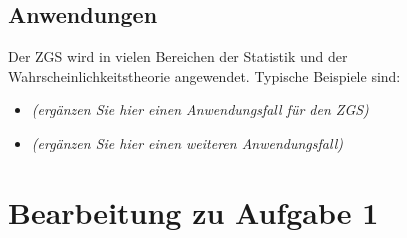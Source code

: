 \documentclass{article}
\begin{document}
\subsection{Anwendungen}

Der ZGS wird in vielen Bereichen der Statistik und der Wahrscheinlichkeitstheorie angewendet. Typische Beispiele sind:

\begin{itemize}
    \item \textit{(ergänzen Sie hier einen Anwendungsfall für den ZGS)}
    \item \textit{(ergänzen Sie hier einen weiteren Anwendungsfall)}
\end{itemize}






\newpage
\section{Bearbeitung zu Aufgabe 1}
\end{document}
